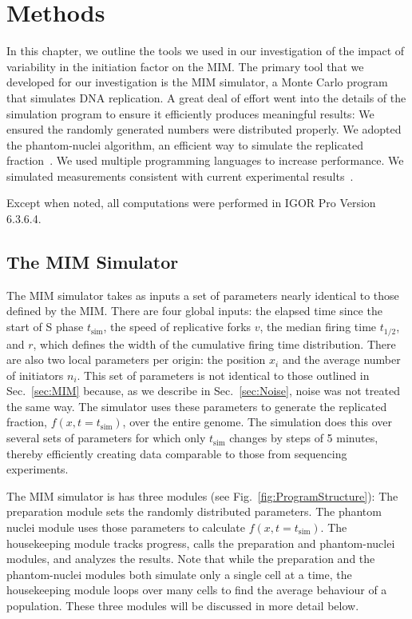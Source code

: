 \chapter{Methods}
\label{ch:Methods}

In this chapter, we outline the tools we used in our investigation of the impact of variability in the initiation factor on the MIM.
The primary tool that we developed for our investigation is the MIM simulator, a Monte Carlo program that simulates DNA replication.
A great deal of effort went into the details of the simulation program to ensure it efficiently produces meaningful results:
We ensured the randomly generated numbers were distributed properly.
We adopted the phantom-nuclei algorithm, an efficient way to simulate the replicated fraction~\cite{KJMA1}.
We used multiple programming languages to increase performance.
We simulated measurements consistent with current experimental results~\cite{StochasticTermination}.

Except when noted, all computations were performed in IGOR Pro Version 6.3.6.4.


	\section{The MIM Simulator}
	\label{sec:MIMSimulator}
	
	The MIM simulator takes as inputs a set of parameters nearly identical to those defined by the MIM.
	There are four global inputs: the elapsed time since the start of S phase $t_\text{sim}$, the speed of replicative forks $v$, the median firing time $t_{1/2}$, and $r$, which defines the width of the cumulative firing time distribution.
	There are also two local parameters per origin: the position $x_i$ and the average number of initiators $n_i$.
	This set of parameters is not identical to those outlined in Sec.~\ref{sec:MIM} because, as we describe in Sec.~\ref{sec:Noise}, noise was not treated the same way.
	The simulator uses these parameters to generate the replicated fraction, $f(x,t=t_\text{sim})$, over the entire genome.
	The simulation does this over several sets of parameters for which only $t_\text{sim}$ changes by steps of 5 minutes, thereby efficiently creating data comparable to those from sequencing experiments.
	
	The MIM simulator is has three modules (see Fig.~\ref{fig:ProgramStructure}):
	The preparation module sets the randomly distributed parameters.
	The phantom nuclei module uses those parameters to calculate $f(x,t=t_\text{sim})$.
	The housekeeping module tracks progress, calls the preparation and phantom-nuclei modules, and analyzes the results.
	Note that while the preparation and the phantom-nuclei modules both simulate only a single cell at a time, the housekeeping module loops over many cells to find the average behaviour of a population.
	These three modules will be discussed in more detail below.
		
